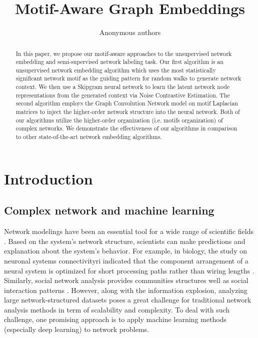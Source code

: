 \documentclass{article}
\title{Motif-Aware Graph Embeddings}
\author{Anonymous authors}
\theoremstyle{definition}
\begin{document}
\maketitle

\begin{abstract}

  In this paper, we propose our motif-aware approaches to the 
  unsupervised network embedding and semi-supervised network labeling 
  task. Our first algorithm is an unsupervised network embedding 
  algorithm which uses the most statistically significant network motif 
  as the guiding pattern for random walks to generate network context. We 
  then use a Skipgram neural network to learn the latent network node 
  representations from the generated context via Noise Contrastive 
  Estimation. The second algorithm employs the Graph Convolution Network 
  model on motif Laplacian matrices to inject the higher-order network 
  structure into the neural network. Both of our algorithms utilize the 
  higher-order organization (i.e. motifs organization) of complex 
  networks. We demonstrate the effectiveness of our algorithms in 
  comparison to other state-of-the-art network embedding algorithms.

\end{abstract}

\section{Introduction}

\subsection{Complex network and machine learning}

Network modelings have been an essential tool for a wide
range of scientific fields
\cite{physicnet,molecule,youtube,motifblockmilo,juremotif}. 
Based on the system's network structure, 
scientists can make predictions and explanation
about the system's behavior. For example, in biology, the
study on neuronal systems connectivityri indicated
that the component arrangement of a neural system is optimized
for short processing paths rather than wiring lengths
\cite{kaiser2006nonoptimal}. Similarly, social network
analysis provides communities structures well as 
social interaction patterns 
\cite{west2014exploiting,barabasi2014network}. 
However, along with the information explosion, analyzing
large network-structured datasets poses a great challenge 
for traditional network analysis methods in term of 
scalability and complexity. To deal with such challenge,
one promising approach is to apply machine learning methods 
(especially deep learning) to network problems.
\end{document}
